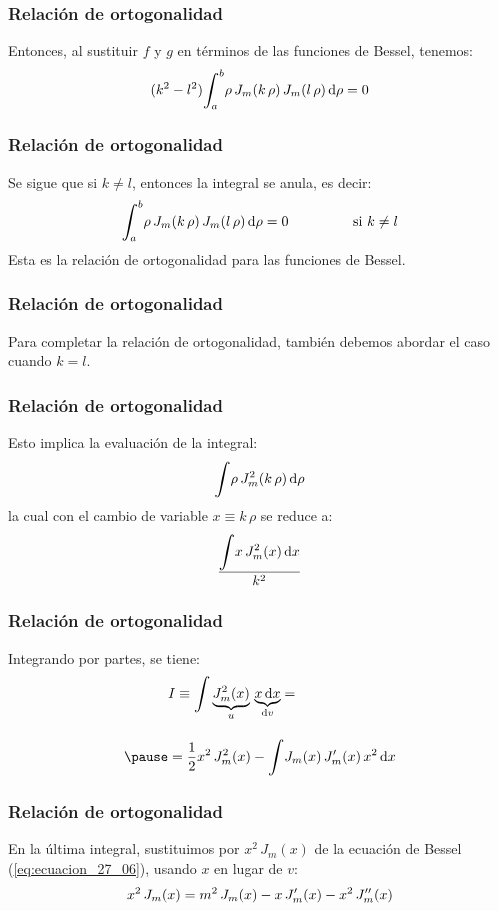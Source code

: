 \documentclass[12pt]{beamer}
\begin{document}
\begin{frame}
\frametitle{Relación de ortogonalidad}
Entonces, al sustituir $f$ y $g$ en términos de las funciones de Bessel, tenemos:
\pause
\begin{align*}
(k^{2} - l^{2}) \scaleint{6ex}_{\bs a}^{b} \rho \, J_{m} (k \, \rho) \, J_{m}(l \, \rho) \dd{\rho} = 0
\end{align*}
\end{frame}
\begin{frame}
\frametitle{Relación de ortogonalidad}
Se sigue que si $k \neq l$, entonces la integral se anula, es decir:
\pause
\begin{equation}
\scaleint{6ex}_{\bs a}^{b} \rho \, J_{m} (k \, \rho) \, J_{m}(l \, \rho) \dd{\rho} = 0 \hspace{1.5cm} \mbox{ si } k \neq l
\label{eq:ecuacion_27_20}
\end{equation}
\pause
Esta es la relación de ortogonalidad para las funciones de Bessel.
\end{frame}
\begin{frame}
\frametitle{Relación de ortogonalidad}
Para completar la relación de ortogonalidad, también debemos abordar el caso cuando $k = l$.
\end{frame}
\begin{frame}
\frametitle{Relación de ortogonalidad}
Esto implica la evaluación de la integral:
\pause
\begin{align*}
\displaystyle \scaleint{6ex} \rho \, J_{m}^{2} ( k \, \rho) \dd{\rho}
\end{align*}
\pause
la cual con el cambio de variable $x \equiv k \, \rho$ se reduce a:
\pause
\begin{align*}
\dfrac{\displaystyle \scaleint{6ex} x \, J_{m}^{2} (x) \dd{x}}{k^{2}}
\end{align*}
\end{frame}
\begin{frame}
\frametitle{Relación de ortogonalidad}
Integrando por partes, se tiene:
\pause
\begin{eqnarray*}
\begin{aligned}
&I \equiv \scaleint{6ex}  \underbrace{J_{m}^{2} (x)}_{u} \, \underbrace{x \dd{x}}_{\dd{v}} = \\[1em] \pause
&= \dfrac{1}{2} x^{2} \, J_{m}^{2} (x) - \scaleint{6ex} J_{m}(x) \, \pderivada{J}_{m} (x) \, x^{2} \dd{x}
\end{aligned}
\end{eqnarray*}
\end{frame}
\begin{frame}
\frametitle{Relación de ortogonalidad}
En la última integral, sustituimos por $x^{2} \, J_{m} (x)$ de la ecuación de Bessel (\ref{eq:ecuacion_27_06}), usando $x$ en lugar de $v$:
\pause
\begin{align*}
x^{2} \, J_{m} (x) =  m^{2} \, J_{m}(x) - x \, {J}^{\prime}_{m} (x) - x^{2} \, {J}^{\prime \prime}_{m} (x)
\end{align*}
\end{frame}
\end{document}
